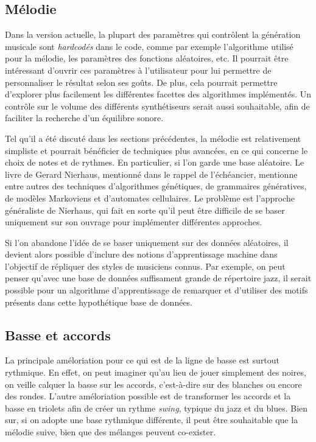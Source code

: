\documentclass[letterpaper,12pt]{scrartcl}
\begin{document}
		\subsection{Mélodie}
		Dans la version actuelle, la plupart des paramètres qui contrôlent la génération musicale sont \textit{hardcodés} dans le code, comme par exemple l'algorithme utilisé pour la mélodie, les paramètres des fonctions aléatoires, etc. Il pourrait être intéressant d'ouvrir ces paramètres à l'utilisateur pour lui permettre de personnaliser le résultat selon ses goûts. De plus, cela pourrait permettre d'explorer plus facilement les différentes facettes des algorithmes implémentés. Un contrôle sur le volume des différents synthétiseurs serait aussi souhaitable, afin de faciliter la recherche d'un équilibre sonore.
		
		Tel qu'il a été discuté dans les sections précédentes, la mélodie est relativement simpliste et pourrait bénéficier de techniques plus avancées, en ce qui concerne le choix de notes et de rythmes. En particulier, si l'on garde une base aléatoire. Le livre de Gerard Nierhaus, mentionné dans le rappel de l'échéancier, mentionne entre autres des techniques d'algorithmes génétiques, de grammaires génératives, de modèles Markoviens et d'automates cellulaires. Le problème est l'approche généraliste de Nierhaus, qui fait en sorte qu'il peut être difficile de se baser uniquement sur son ouvrage pour implémenter différentes approches.
		
		Si l'on abandone l'idée de se baser uniquement sur des données aléatoires, il devient alors possible d'inclure des notions d'apprentissage machine dans l'objectif de répliquer des styles de musiciens connus. Par exemple, on peut penser qu'avec une base de données suffisament grande de répertoire jazz, il serait possible pour un algorithme d'apprentissage de remarquer et d'utiliser des motifs présents dans cette hypothétique base de données.
		\subsection{Basse et accords}
		La principale améloriation pour ce qui est de la ligne de basse est surtout rythmique. En effet, on peut imaginer qu'au lieu de jouer simplement des noires, on veille calquer la basse sur les accords, c'est-à-dire sur des blanches ou encore des rondes. L'autre améloriation possible est de transformer les accords et la basse en triolets afin de créer un rythme \textit{swing}, typique du jazz et du blues. Bien sur, si on adopte une base rythmique différente, il peut être souhaitable que la mélodie suive, bien que des mélanges peuvent co-exister.
		
\end{document}
